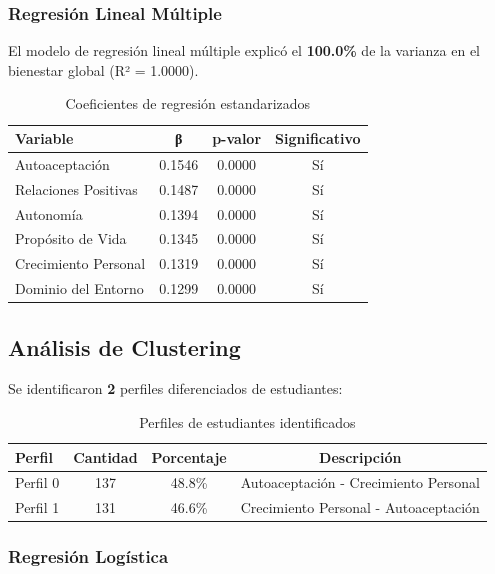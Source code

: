 \documentclass[12pt,a4paper]{article}
\begin{document}
\subsubsection{Regresión Lineal Múltiple}
El modelo de regresión lineal múltiple explicó el \textbf{100.0\%} 
de la varianza en el bienestar global (R² = 1.0000).

\begin{table}[H]
\centering
\caption{Coeficientes de regresión estandarizados}
\label{tab:regresion}
\begin{tabular}{@{}lccc@{}}
\toprule
\textbf{Variable} & \textbf{β} & \textbf{p-valor} & \textbf{Significativo} \\
\midrule
Autoaceptación & 0.1546 & 0.0000 & Sí \\
Relaciones Positivas & 0.1487 & 0.0000 & Sí \\
Autonomía & 0.1394 & 0.0000 & Sí \\
Propósito de Vida & 0.1345 & 0.0000 & Sí \\
Crecimiento Personal & 0.1319 & 0.0000 & Sí \\
Dominio del Entorno & 0.1299 & 0.0000 & Sí \\

\bottomrule
\end{tabular}
\end{table}


\subsection{Análisis de Clustering}

Se identificaron \textbf{2} perfiles diferenciados de estudiantes:

\begin{table}[H]
\centering
\caption{Perfiles de estudiantes identificados}
\label{tab:clusters}
\begin{tabular}{@{}lccc@{}}
\toprule
\textbf{Perfil} & \textbf{Cantidad} & \textbf{Porcentaje} & \textbf{Descripción} \\
\midrule
Perfil 0 & 137 & 48.8\% & Autoaceptación - Crecimiento Personal \\
Perfil 1 & 131 & 46.6\% & Crecimiento Personal - Autoaceptación \\

\bottomrule
\end{tabular}
\end{table}


\subsubsection{Regresión Logística}
\end{document}
